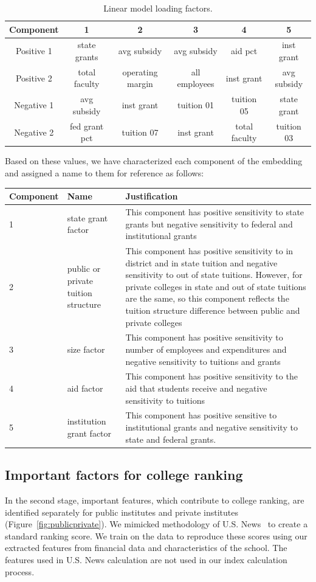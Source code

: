\documentclass[11pt,letter]{article}
\begin{document}
\begin{table}[H]
\begin{tabular}{|c|c|c|c|c|c|}
\hline
Component &  1 &  2 &  3 & 4 & 5\\
\hline
Positive 1 & state grants & avg subsidy & avg subsidy & aid pct & inst grant\\
Positive 2 & total faculty&  operating margin &all employees &  inst grant &  avg subsidy\\
Negative 1 & avg subsidy&  inst grant & tuition 01 &  tuition 05 &  state grant \\
Negative 2 & fed grant pct&  tuition 07 &  inst grant & total faculty& tuition 03 \\
\hline
\end{tabular}
\caption{Linear model loading factors.}\label{tab:linearloads}
\end{table}
Based on these values, we have characterized each component of the embedding and assigned a name to them for reference as follows:
\begin{table}[H]
\begin{tabular}{|p{2cm}|p{4cm}|p{9cm}|}
\hline
Component & Name & Justification\\
\hline
1 & state grant factor& This component has positive sensitivity to state grants but negative sensitivity to federal and institutional grants\\
\hline
2 & public or private tuition structure & This component has positive sensitivity to in district and in state tuition and negative sensitivity to out of state tuitions. However, for private colleges in state and out of state tuitions are the same, so this component reflects the tuition structure difference between public and private colleges\\
\hline
3 & size factor & This component has positive sensitivity to number of employees and expenditures and negative sensitivity to tuitions and grants \\
\hline 
4 & aid factor & This component has positive sensitivity to the aid that students receive and negative sensitivity to tuitions\\
\hline
5 & institution grant factor & This component has positive sensitive to institutional grants and negative sensitivity to state and federal grants.\\
\hline
\end{tabular}
\end{table}
\subsection{Important factors for college ranking}
In the second stage, important features, which contribute to college ranking, are identified separately for public institutes and private institutes (Figure~\ref{fig:publicprivate}). We mimicked methodology of U.S. News~\cite{usnews} to create a standard ranking score. We train on the data to reproduce these scores using our extracted features from financial data and characteristics of the school. The features used in U.S. News calculation are not used in our index calculation process.
\end{document}
